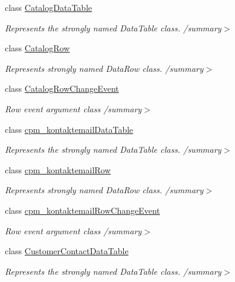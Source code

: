 \begin{DoxyCompactItemize}
class \hyperlink{class_products_1_1_data_1_1ds_sage_1_1_catalog_data_table}{Catalog\+Data\+Table}
\begin{DoxyCompactList}\small\item\em Represents the strongly named Data\+Table class. /summary$>$ \end{DoxyCompactList}\item 
class \hyperlink{class_products_1_1_data_1_1ds_sage_1_1_catalog_row}{Catalog\+Row}
\begin{DoxyCompactList}\small\item\em Represents strongly named Data\+Row class. /summary$>$ \end{DoxyCompactList}\item 
class \hyperlink{class_products_1_1_data_1_1ds_sage_1_1_catalog_row_change_event}{Catalog\+Row\+Change\+Event}
\begin{DoxyCompactList}\small\item\em Row event argument class /summary$>$ \end{DoxyCompactList}\item 
class \hyperlink{class_products_1_1_data_1_1ds_sage_1_1cpm__kontaktemail_data_table}{cpm\+\_\+kontaktemail\+Data\+Table}
\begin{DoxyCompactList}\small\item\em Represents the strongly named Data\+Table class. /summary$>$ \end{DoxyCompactList}\item 
class \hyperlink{class_products_1_1_data_1_1ds_sage_1_1cpm__kontaktemail_row}{cpm\+\_\+kontaktemail\+Row}
\begin{DoxyCompactList}\small\item\em Represents strongly named Data\+Row class. /summary$>$ \end{DoxyCompactList}\item 
class \hyperlink{class_products_1_1_data_1_1ds_sage_1_1cpm__kontaktemail_row_change_event}{cpm\+\_\+kontaktemail\+Row\+Change\+Event}
\begin{DoxyCompactList}\small\item\em Row event argument class /summary$>$ \end{DoxyCompactList}\item 
class \hyperlink{class_products_1_1_data_1_1ds_sage_1_1_customer_contact_data_table}{Customer\+Contact\+Data\+Table}
\begin{DoxyCompactList}\small\item\em Represents the strongly named Data\+Table class. /summary$>$ \end{DoxyCompactList}\item 

\end{DoxyCompactItemize}
